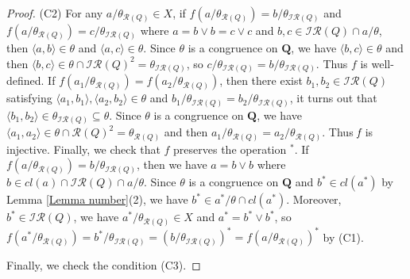 \documentclass[12pt]{amsart}
\theoremstyle{definition}
\theoremstyle{remark}
\numberwithin{equation}{section}
\begin{document}
\begin{proof}
(C2) For any $a/\theta_{\mathscr{R}(Q)}\in X$, if $f(a/\theta_{\mathscr{R}(Q)})=b/\theta_{\mathscr{IR}(Q)}$ and $f(a/\theta_{\mathscr{R}(Q)})=c/\theta_{\mathscr{IR}(Q)}$ where $a=b\vee b=c\vee c$ and $b,c\in \mathscr{IR}(Q)\cap a/\theta$, then $\langle a,b\rangle\in \theta$ and $\langle a,c\rangle\in \theta$. Since $\theta$ is a congruence on $\mathbf{Q}$, we have $\langle b,c\rangle\in \theta$ and then $\langle b,c\rangle\in \theta\cap \mathscr{IR}(Q)^{2}=\theta_{\mathscr{IR}(Q)}$, so $c/\theta_{\mathscr{IR}(Q)}=b/\theta_{\mathscr{IR}(Q)}$. Thus $f$ is well-defined.
If $f(a_{1}/\theta_{\mathscr{R}(Q)})=f(a_{2}/\theta_{\mathscr{R}(Q)})$, then there exist $b_{1},b_{2}\in \mathscr{IR}(Q)$ satisfying $\langle a_{1},b_{1}\rangle,\langle a_{2},b_{2}\rangle\in \theta$ and  $b_{1}/\theta_{\mathscr{IR}(Q)}=b_{2}/\theta_{\mathscr{IR}(Q)}$, it turns out that $\langle b_{1},b_{2}\rangle\in \theta_{\mathscr{IR}(Q)}\subseteq\theta$. Since $\theta$ is a congruence on $\mathbf{Q}$, we have $\langle a_{1},a_{2}\rangle\in \theta\cap \mathscr{R}(Q)^{2}=\theta_{\mathscr{R}(Q)}$ and then $a_{1}/\theta_{\mathscr{R}(Q)}=a_{2}/\theta_{\mathscr{R}(Q)}$. Thus $\emph{f}$ is injective.
Finally, we check that $f$ preserves the operation $^{\ast}$.
If $f(a/\theta_{\mathscr{R}(Q)})=b/\theta_{\mathscr{IR}(Q)}$, then we have $a=b\vee b$ where $b\in cl(a)\cap\mathscr{IR}(Q)\cap a/\theta$. Since $\theta$ is a congruence on $\mathbf{Q}$ and $b^{\ast}\in cl(a^{\ast})$ by Lemma \ref{Lemma number}(2), we have $b^{\ast}\in a^{\ast}/\theta\cap cl(a^{\ast})$. Moreover, $b^{\ast}\in \mathscr{IR}(Q)$,  we have $a^{\ast}/\theta_{\mathscr{R}(Q)} \in X$ and $a^{\ast}=b^{\ast}\vee b^{\ast}$, so $f(a^{\ast}/\theta_{\mathscr{R}(Q)})=b^{\ast}/\theta_{\mathscr{IR}(Q)}=(b/\theta_{\mathscr{IR}(Q)})^{\ast}=f(a/\theta_{\mathscr{R}(Q)})^{\ast}$ by (C1).

Finally, we check the condition (C3).


\end{proof}
\end{document}
